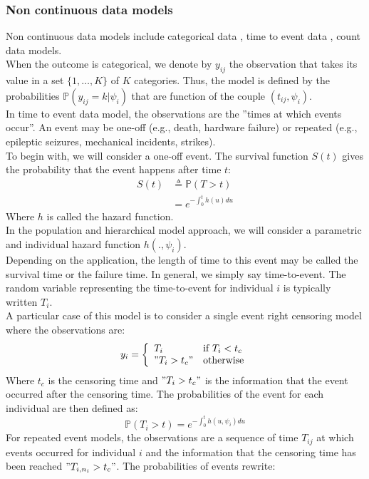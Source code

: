 \documentclass[a4paper]{article}
\theoremstyle{plain}
\theoremstyle{plain}
\theoremstyle{definition}
\begin{document}
 \subsubsection{Non continuous data models}\label{noncontinuousdef}
Non continuous data models include categorical data \cite{savic, agresti}, time to event data \cite{mbogning, andersen}, count data \cite{savic} models.\\
When the outcome is categorical, we denote by $y_{ij}$ the observation that takes its value in a set $\{1, \dots, K\}$ of $K$ categories. Thus, the model is defined by the probabilities $\mathbb{P}(y_{ij} = k | \psi_i)$ that are function of the couple $(t_{ij},\psi_i)$.\\
In time to event data model, the observations are the ''times at which events occur''. An event may be one-off (e.g., death, hardware failure) or repeated (e.g., epileptic seizures, mechanical incidents, strikes).\\
To begin with, we will consider a one-off event. The survival function $S(t)$ gives the probability that the event happens after time $t$:
\begin{equation}\label{survival}
\begin{split}
S(t) & \triangleq \mathbb{P}(T >t)\\
& = e^{-\int_{0}^{t}h(u)du}
\end{split}
\end{equation}
Where $h$ is called the hazard function.\\
In the population and hierarchical model approach, we will consider a parametric and individual hazard function $h(.,\psi_i)$.\\
Depending on the application, the length of time to this event may be called the survival time or the failure time. In general, we simply say time-to-event.
The random variable representing the time-to-event for individual $i$ is typically written $T_i$.\\
A particular case of this model is to consider a single event right censoring model where the observations are:
\begin{equation}
    y_i = \left\{
    \begin{array}{ll}
        T_i & \mbox{if } T_i < t_c \\
        "T_i > t_c" & \mbox{otherwise}
    \end{array}
\right.
\end{equation}
Where $t_c$ is the censoring time and $"T_i > t_c"$ is the information that the event occurred after the censoring time. The probabilities of the event for each individual are then defined as:
\begin{equation}
\mathbb{P}(T_i > t) = e^{-\int_{0}^{t}h(u, \psi_i)du}
\end{equation}
For repeated event models, the observations are a sequence of time $T_{ij}$ at which events occurred for individual $i$ and the information that the censoring time has been reached $"T_{i,n_i} > t_c"$. The probabilities of events rewrite:
\end{document}
